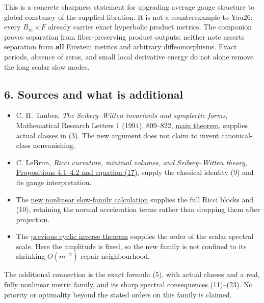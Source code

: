 \documentclass[
  11pt,
]{article}
\providecommand{\tightlist}{%
  \setlength{\itemsep}{0pt}\setlength{\parskip}{0pt}}
\begin{document}
This is a concrete sharpness statement for upgrading average gauge
structure to global constancy of the supplied fibration. It is not a
counterexample to Yau26: every \(B_m\times F\) already carries exact
hyperbolic product metrics. The companion proves separation from
fiber-preserving product outputs; neither note asserts separation from
\textbf{all} Einstein metrics and arbitrary diffeomorphisms. Exact
periods, absence of zeros, and small local derivative energy do not
alone remove the long scalar slow modes.

\hypertarget{sources-and-what-is-additional}{%
\subsection{6. Sources and what is
additional}\label{sources-and-what-is-additional}}

\begin{itemize}
\tightlist
\item
  C. H. Taubes, \emph{The Seiberg--Witten invariants and symplectic
  forms}, Mathematical Research Letters 1 (1994), 809--822,
  \href{https://intlpress.com/site/pub/files/_fulltext/journals/mrl/1994/0001/0006/MRL-1994-0001-0006-a015.pdf}{main
  theorem}, supplies actual classes in (3). The new argument does not
  claim to invent canonical-class nonvanishing.
\item
  C. LeBrun, \emph{Ricci curvature, minimal volumes, and Seiberg--Witten
  theory}, \href{https://arxiv.org/html/math/0003068}{Propositions
  4.1--4.2 and equation (17)}, supply the classical identity (9) and its
  gauge interpretation.
\item
  The \href{20260924_nonlinear_slow_moduli.md}{new nonlinear slow-family
  calculation} supplies the full Ricci blocks and (10), retaining the
  normal acceleration terms rather than dropping them after projection.
\item
  The \href{20260924_integrable_kernel_cyclic_repair.md}{previous cyclic
  inverse theorem} supplies the order of the scalar spectral scale. Here
  the amplitude is fixed, so the new family is not confined to its
  shrinking \(O(m^{-2})\) repair neighbourhood.
\end{itemize}

The additional connection is the exact formula (5), with actual classes
and a real, fully nonlinear metric family, and its sharp spectral
consequences (11)--(23). No priority or optimality beyond the stated
orders on this family is claimed.
\end{document}
